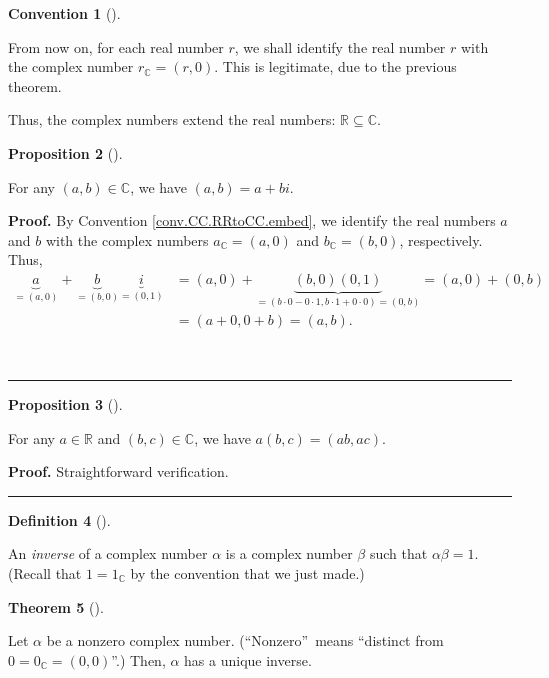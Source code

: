 \documentclass[numbers=enddot,12pt,final,onecolumn,notitlepage]{scrartcl}%
\numberwithin{exer}{subsection}
\theoremstyle{definition}
\newtheorem{theo}{Theorem}[subsection]
\newenvironment{theorem}[1][]
{\begin{theo}[#1]\begin{leftbar}}
{\end{leftbar}\end{theo}}
\newtheorem{prop}[theo]{Proposition}
\newenvironment{proposition}[1][]
{\begin{prop}[#1]\begin{leftbar}}
{\end{leftbar}\end{prop}}
\newtheorem{defi}[theo]{Definition}
\newenvironment{definition}[1][]
{\begin{defi}[#1]\begin{leftbar}}
{\end{leftbar}\end{defi}}
\newtheorem{conv}[theo]{Convention}
\newenvironment{convention}[1][]
{\begin{conv}[#1]\begin{leftbar}}
{\end{leftbar}\end{conv}}
\newenvironment{proof}[1][Proof]{\noindent\textbf{#1.} }{\ \rule{0.5em}{0.5em}}
\begin{document}
\begin{convention}
\label{conv.CC.RRtoCC.embed}From now on, for each real number $r$, we shall
identify the real number $r$ with the complex number $r_{\mathbb{C}}=\left(
r,0\right)  $. This is legitimate, due to the previous theorem.
\end{convention}

Thus, the complex numbers extend the real numbers: $\mathbb{R}\subseteq
\mathbb{C}$.

\begin{proposition}
\label{prop.CC.RRtoCC.a+bi}For any $\left(  a,b\right)  \in\mathbb{C}$, we
have $\left(  a,b\right)  =a+bi$.
\end{proposition}

\begin{proof}
By Convention \ref{conv.CC.RRtoCC.embed}, we identify the real numbers $a$ and
$b$ with the complex numbers $a_{\mathbb{C}}=\left(  a,0\right)  $ and
$b_{\mathbb{C}}=\left(  b,0\right)  $, respectively. Thus,%
\begin{align*}
\underbrace{a}_{=\left(  a,0\right)  }+\underbrace{b}_{=\left(  b,0\right)
}\underbrace{i}_{=\left(  0,1\right)  }  &  =\left(  a,0\right)
+\underbrace{\left(  b,0\right)  \left(  0,1\right)  }_{=\left(
b\cdot0-0\cdot1,b\cdot1+0\cdot0\right)  =\left(  0,b\right)  }=\left(
a,0\right)  +\left(  0,b\right) \\
&  =\left(  a+0,0+b\right)  =\left(  a,b\right)  .
\end{align*}

\end{proof}

\begin{proposition}
\label{prop.CC.CC.a(b,c)}For any $a\in\mathbb{R}$ and $\left(  b,c\right)
\in\mathbb{C}$, we have $a\left(  b,c\right)  =\left(  ab,ac\right)  $.
\end{proposition}

\begin{proof}
Straightforward verification.
\end{proof}

\begin{definition}
\label{def.CC.CC.inverse.inverse}An \textit{inverse} of a complex number
$\alpha$ is a complex number $\beta$ such that $\alpha\beta=1$. (Recall that
$1=1_{\mathbb{C}}$ by the convention that we just made.)
\end{definition}

\begin{theorem}
\label{thm.CC.CC.inverse.unique}Let $\alpha$ be a nonzero complex number.
(\textquotedblleft Nonzero\textquotedblright\ means \textquotedblleft distinct
from $0=0_{\mathbb{C}}=\left(  0,0\right)  $\textquotedblright.) Then,
$\alpha$ has a unique inverse.
\end{theorem}
\end{document}
